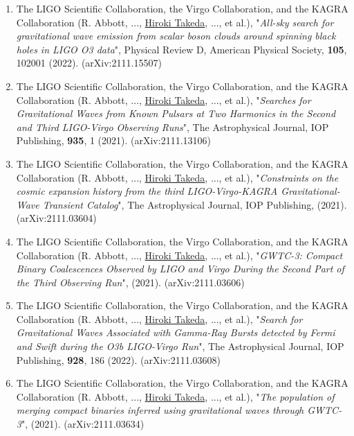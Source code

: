\documentclass[uplatex, 11pt]{jsarticle}
\begin{document}
\begin{enumerate}
\item The LIGO Scientific Collaboration, the Virgo Collaboration, and the KAGRA Collaboration (R. Abbott, ..., \uline{Hiroki Takeda}, ..., et al.), "\emph{All-sky search for gravitational wave emission from scalar boson clouds around spinning black holes in LIGO O3 data}", Physical Review D, American Physical Society, {\bf 105}, 102001 (2022). (arXiv:2111.15507)\\

\item The LIGO Scientific Collaboration, the Virgo Collaboration, and the KAGRA Collaboration (R. Abbott, ..., \uline{Hiroki Takeda}, ..., et al.), "\emph{Searches for Gravitational Waves from Known Pulsars at Two Harmonics in the Second and Third LIGO-Virgo Observing Runs}", The Astrophysical Journal, IOP Publishing, {\bf935}, 1 (2021). (arXiv:2111.13106)\\

\item The LIGO Scientific Collaboration, the Virgo Collaboration, and the KAGRA Collaboration (R. Abbott, ..., \uline{Hiroki Takeda}, ..., et al.), "\emph{Constraints on the cosmic expansion history from the third LIGO-Virgo-KAGRA Gravitational-Wave Transient Catalog}", The Astrophysical Journal, IOP Publishing, (2021). (arXiv:2111.03604)\\

\item The LIGO Scientific Collaboration, the Virgo Collaboration, and the KAGRA Collaboration (R. Abbott, ..., \uline{Hiroki Takeda}, ..., et al.), "\emph{GWTC-3: Compact Binary Coalescences Observed by LIGO and Virgo During the Second Part of the Third Observing Run}", (2021). (arXiv:2111.03606)\\

\item The LIGO Scientific Collaboration, the Virgo Collaboration, and the KAGRA Collaboration (R. Abbott, ..., \uline{Hiroki Takeda}, ..., et al.),
"\emph{Search for Gravitational Waves Associated with Gamma-Ray Bursts detected by Fermi and Swift during the O3b LIGO-Virgo Run}",
The Astrophysical Journal, IOP Publishing, {\bf 928}, 186 (2022).
(arXiv:2111.03608) \\

\item The LIGO Scientific Collaboration, the Virgo Collaboration, and the KAGRA Collaboration (R. Abbott, ..., \uline{Hiroki Takeda}, ..., et al.), "\emph{The population of merging compact binaries inferred using gravitational waves through GWTC-3}", (2021). (arXiv:2111.03634)\\


\end{enumerate}
\end{document}
